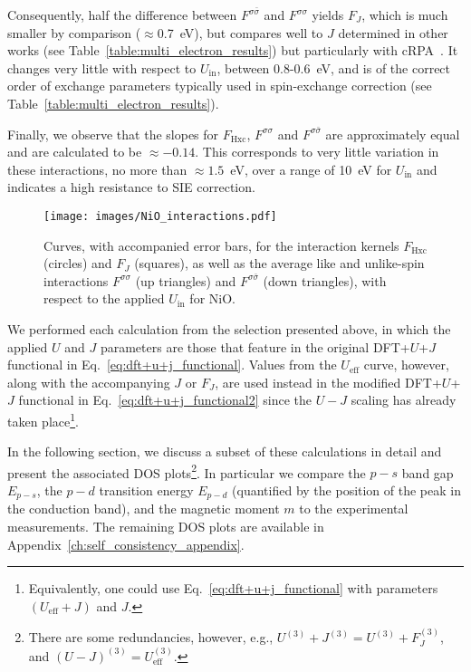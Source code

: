 Consequently, 
half the difference between 
$F^{\sigma\bar{\sigma}}$  and $F^{\sigma\sigma}$ yields $F_J$, 
which is much smaller by comparison ($\approx$0.7~eV), 
but compares well to $J$ determined in other works 
(see Table~\ref{table:multi_electron_results}) 
but particularly with cRPA~\cite{PhysRevB.81.245113,PhysRevB.87.165118,zhang2017dft+,PhysRevB.82.045108,PhysRevB.96.045137,PhysRevB.85.045132}.
%
It changes very little with respect to $U_\textrm{in}$, 
between 0.8-0.6~eV,
and is of the correct order of 
exchange parameters typically 
used in spin-exchange correction 
(see Table~\ref{table:multi_electron_results}).

Finally, 
we observe that the slopes for 
$F_\textrm{Hxc}$, $F^{\sigma\sigma}$ and $F^{\sigma\bar{\sigma}}$ 
are approximately equal  
and are calculated to be $\approx-0.14$.
%
This corresponds to very little variation in these interactions, 
no more than $\approx1.5$~eV, 
over a range of 10~eV for $U_\textrm{in}$ 
and indicates a high resistance to SIE correction.

\begin{figure}[th!]
\centering
\texttt{[image: images/NiO\_interactions.pdf]}
\caption[Profiles of $F_\textrm{Hxc}$, $F_J$,  $F^{\sigma\sigma}$, 
$F^{\sigma\bar{\sigma}}$ vs $U_\textrm{in}$ for NiO]
{Curves, with accompanied error bars, 
for the interaction kernels 
$F_\textrm{Hxc}$ (circles) and $F_J$ (squares), 
as well as the average like and unlike-spin interactions 
$F^{\sigma\sigma}$ (up triangles) and $F^{\sigma\bar{\sigma}}$ (down triangles), 
with respect to the applied $U_\textrm{in}$ for NiO.}
\label{fig:NiO_interactions}
\end{figure}


We performed each calculation 
from the selection presented above, 
in which the applied $U$ and $J$
parameters are those that feature in 
the original DFT+$U$+$J$ functional 
in Eq.~\eqref{eq:dft+u+j_functional}.
%
%
Values from the $U_\textrm{eff}$ curve, however, 
along with the accompanying $J$ or $F_J$, 
are used instead in the 
modified DFT+$U$+$J$ functional 
in Eq.~\eqref{eq:dft+u+j_functional2} 
since the $U-J$ scaling has already taken 
place\footnote{Equivalently, 
one could use Eq.~\eqref{eq:dft+u+j_functional} 
with parameters $(U_\textrm{eff}+J)$ and $J$.}.

In the following section, 
we discuss a subset of these calculations in detail 
and present the associated DOS 
plots\footnote{There are some redundancies, however, e.g., $U^{(3)}+J^{(3)}=U^{(3)}+F_J^{(3)}$, 
and $(U-J)^{(3)}=U_\textrm{eff}^{(3)}$.}.
%
In particular we compare 
the $p-s$ band gap $E_{p-s}$, 
the $p-d$ transition energy $E_{p-d}$ 
(quantified by the position of the peak in the conduction band), 
and the magnetic moment $m$ 
to the experimental measurements.
%
The remaining DOS plots are 
available in Appendix~\ref{ch:self_consistency_appendix}.

